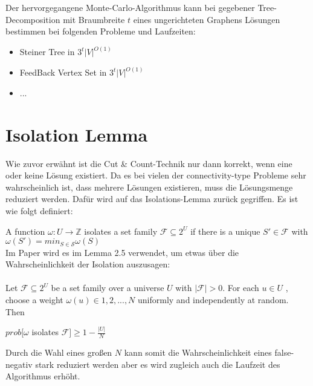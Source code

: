 Der hervorgegangene Monte-Carlo-Algorithmus kann bei gegebener Tree-Decomposition mit Braumbreite $t$ eines ungerichteten Graphens Lösungen bestimmen bei folgenden Probleme und Laufzeiten:
\begin{itemize}
\item Steiner Tree in $3^t |V|^{O(1)}$
\item FeedBack Vertex Set in $3^t|V|^{O(1)}$
\item ...
\end{itemize}

\section{Isolation Lemma}
\label{sec:test}

Wie zuvor erwähnt ist die Cut \& Count-Technik nur dann korrekt, wenn eine oder keine Lösung existiert. Da es bei vielen der connectivity-type Probleme sehr  wahrscheinlich ist, dass mehrere Lösungen existieren, muss die Lösungsmenge reduziert werden. Dafür wird auf das Isolations-Lemma zurück gegriffen. Es ist wie folgt definiert:

A function $\omega : U \rightarrow \mathbb{Z}$ isolates a set family $\mathcal{F} \subseteq 2^U$ if there is a unique $S' \in \mathcal{F}$ with $\omega (S')=min_{S \in \mathcal{S}} \omega(S)$\\

Im Paper wird es im Lemma 2.5 verwendet, um etwas über die Wahrscheinlichkeit der Isolation auszusagen:\\
\\Let $\mathcal{F} \subseteq 2^U$ be a set family over a universe $U$ with $|\mathcal{F}| > 0$. For each $u \in U$ ,
choose a weight $\omega(u) \in {1, 2, . . . , N }$ uniformly and independently at random. Then
\begin{center}
$prob[\omega$ isolates $\mathcal{F}]\geq 1 - \frac{|U|}{N}$
\end{center}

Durch die Wahl eines großen $N$ kann somit die Wahrscheinlichkeit eines false-negativ stark reduziert werden aber es wird zugleich auch die Laufzeit des Algorithmus erhöht.